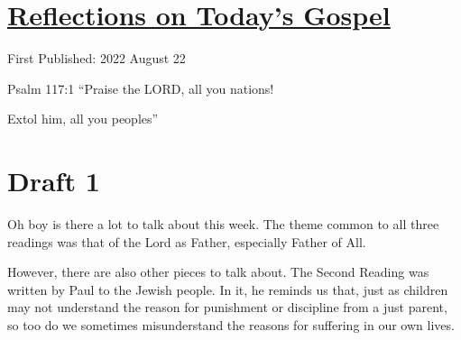\documentclass[12pt]{article}[titlepage]
\newcommand{\say}[1]{``#1''}
\newcommand{\1}{\={a}}
\newcommand{\2}{\={e}}
\newcommand{\3}{\={\i}}
\newcommand{\4}{\=o}
\newcommand{\5}{\=u}
\newcommand{\6}{\={A}}
\renewcommand{\,}{\textsuperscript{,}}
\begin{document}
\doublespacing
\section{\href{reflections-on-readings-21-ordinary-c-22.html}{Reflections on Today's Gospel}}
First Published: 2022 August 22

Psalm 117:1 \say{Praise the LORD, all you nations!

Extol him, all you peoples}

\section{Draft 1}
Oh boy is there a lot to talk about this week.
The theme common to all three readings was that of the Lord as Father, especially Father of All.

However, there are also other pieces to talk about.
The Second Reading was written by Paul to the Jewish people.
In it, he reminds us that, just as children may not understand the reason for punishment or discipline from a just parent, so too do we sometimes misunderstand the reasons for suffering in our own lives.
\end{document}
